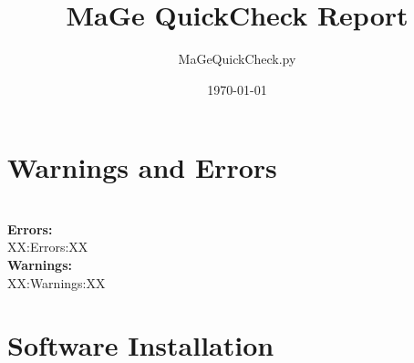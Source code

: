 \documentclass[pdftex, a4paper, 12pt,pointlessnumbers]{scrartcl} %
\title{MaGe QuickCheck Report}
\author{MaGeQuickCheck.py}
\date{\today}
\begin{document}
 
\maketitle

\section{Warnings and Errors}
~\\
\textbf{Errors:}\\
XX:Errors:XX
~\\
\textbf{Warnings:}\\
XX:Warnings:XX

\section{Software Installation}
\end{document}
